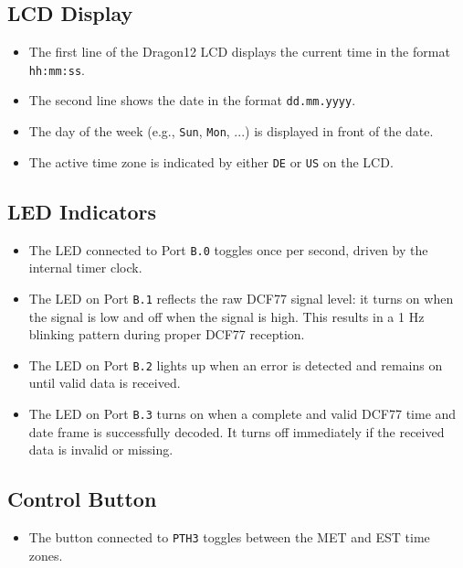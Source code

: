 \documentclass[a4paper,12pt]{article}
\begin{document}

\subsection{LCD Display}
\begin{itemize}
    \item The first line of the Dragon12 LCD displays the current time in the format \texttt{hh:mm:ss}.
    \item The second line shows the date in the format \texttt{dd.mm.yyyy}.
    \item The day of the week (e.g., \texttt{Sun}, \texttt{Mon}, ...) is displayed in front of the date.
    \item The active time zone is indicated by either \texttt{DE} or \texttt{US} on the LCD.
\end{itemize}


\subsection{LED Indicators}
\begin{itemize}
    \item The LED connected to Port \texttt{B.0} toggles once per second, driven by the internal timer clock.
    \item The LED on Port \texttt{B.1} reflects the raw DCF77 signal level: it turns on when the signal is low and off when the signal is high.  
    This results in a 1 Hz blinking pattern during proper DCF77 reception.
    \item The LED on Port \texttt{B.2} lights up when an error is detected and remains on until valid data is received.
    \item The LED on Port \texttt{B.3} turns on when a complete and valid DCF77 time and date frame is successfully decoded.  
    It turns off immediately if the received data is invalid or missing.
\end{itemize}


\subsection{Control Button}
\begin{itemize}
    \item The button connected to \texttt{PTH3} toggles between the MET and EST time zones.
\end{itemize}
\end{document}
